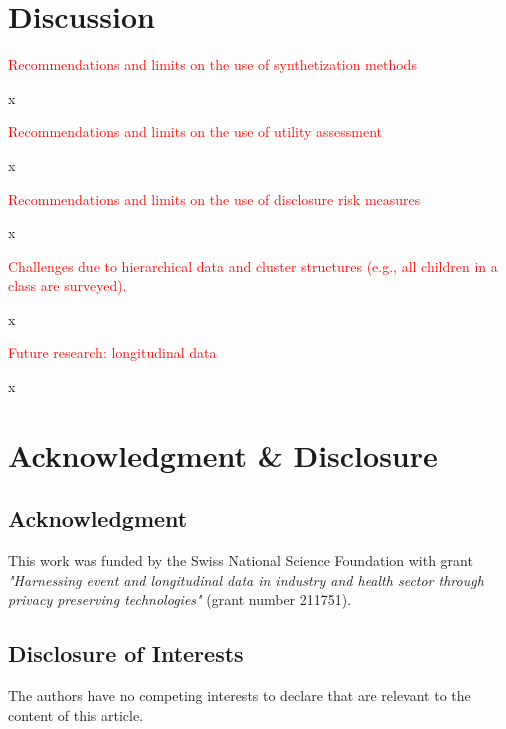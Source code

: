 \documentclass{article}
\begin{document}
\section{Discussion}

\textcolor{red}{Recommendations and limits on the use of synthetization methods}

x

\textcolor{red}{Recommendations and limits on the use of utility assessment}

x

\textcolor{red}{Recommendations and limits on the use of disclosure risk measures}

x

\textcolor{red}{Challenges due to hierarchical data and cluster structures (e.g., all children in a class are surveyed).}

x

\textcolor{red}{Future research: longitudinal data}

x

\section*{Acknowledgment \& Disclosure} 
\subsection*{Acknowledgment} 
This work was funded by the Swiss National Science Foundation with grant \textit{"Harnessing event and longitudinal data in industry and health sector through privacy preserving technologies"} (grant number 211751).

\subsection*{Disclosure of Interests} 
The authors have no competing interests to declare that are relevant to the content of this article. 




\end{document}
